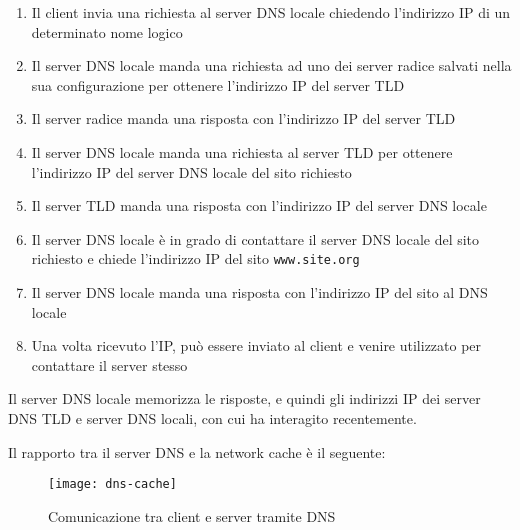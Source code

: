 \documentclass[a4paper]{article}
\begin{document}
\begin{enumerate}
  \item Il client invia una richiesta al server DNS locale chiedendo l'indirizzo IP
    di un determinato nome logico
  \item Il server DNS locale manda una richiesta ad uno dei server radice salvati
    nella sua configurazione per ottenere l'indirizzo IP del server TLD
  \item Il server radice manda una risposta con l'indirizzo IP del server TLD
  \item Il server DNS locale manda una richiesta al server TLD per ottenere l'indirizzo
    IP del server DNS locale del sito richiesto
  \item Il server TLD manda una risposta con l'indirizzo IP del server DNS locale
  \item Il server DNS locale è in grado di contattare il server DNS locale del sito
    richiesto e chiede l'indirizzo IP del sito \texttt{www.site.org}
  \item Il server DNS locale manda una risposta con l'indirizzo IP del sito al DNS locale
  \item Una volta ricevuto l'IP, può essere inviato al client e venire utilizzato per
    contattare il server stesso
\end{enumerate}
Il server DNS locale memorizza le risposte, e quindi gli indirizzi IP dei server DNS TLD
e server DNS locali, con cui ha interagito recentemente.

\vspace{1em}
\noindent
Il rapporto tra il server DNS e la network cache è il seguente:
\begin{figure}[H]
  \centering
  \texttt{[image: dns-cache]}
  \caption{Comunicazione tra client e server tramite DNS}
\end{figure}
\end{document}
